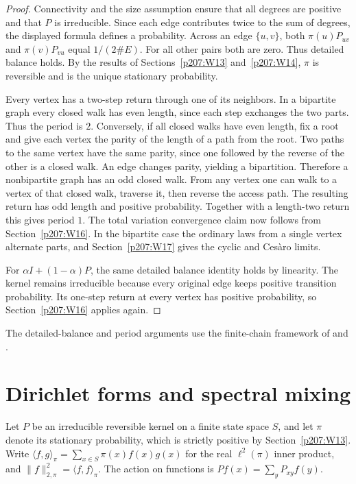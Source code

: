 \documentclass[11pt,oneside,openany]{book}
\theoremstyle{plain}
\theoremstyle{definition}
\theoremstyle{remark}
\begin{document}
\begin{proof}
Connectivity and the size assumption ensure that all degrees are
positive and that \(P\) is irreducible. Since each edge contributes
twice to the sum of degrees, the displayed formula defines a
probability. Across an edge \(\{u,v\}\), both \(\pi(u)P_{uv}\)
and \(\pi(v)P_{vu}\) equal \(1/(2\#E)\). For all other pairs both
are zero. Thus detailed balance holds. By the results of
Sections~\ref{p207:W13} and~\ref{p207:W14}, \(\pi\) is reversible
and is the unique stationary probability.

Every vertex has a two-step return through one of its neighbors.
In a bipartite graph every closed walk has even length, since each
step exchanges the two parts. Thus the period is \(2\).
Conversely, if all closed walks have even length, fix a root and
give each vertex the parity of the length of a path from the root.
Two paths to the same vertex have the same parity, since one
followed by the reverse of the other is a closed walk. An edge
changes parity, yielding a bipartition. Therefore a nonbipartite
graph has an odd closed walk. From any vertex one can walk to a
vertex of that closed walk, traverse it, then reverse the access
path. The resulting return has odd length and positive
probability. Together with a length-two return this gives period
\(1\). The total variation convergence claim now follows from
Section~\ref{p207:W16}. In the bipartite case the ordinary laws from
a single vertex alternate parts, and
Section~\ref{p207:W17} gives the cyclic and Ces\`aro limits.

For \(\alpha I+(1-\alpha)P\), the same detailed balance identity
holds by linearity. The kernel remains irreducible because every
original edge keeps positive transition probability. Its
one-step return at every vertex has positive probability, so
Section~\ref{p207:W16} applies again.
\end{proof}

The detailed-balance and period arguments use the finite-chain
framework of \cite[\S\S1.8--1.9]{Norris} and
\cite[\S\S5.5--5.6]{Durrett}.

\section{Dirichlet forms and spectral mixing}
\label{p207:W25}

Let \(P\) be an irreducible reversible kernel on a finite state space
\(S\), and let \(\pi\) denote its stationary probability, which is
strictly positive by Section~\ref{p207:W13}. Write
\(\langle f,g\rangle_\pi=\sum_{x\in S}\pi(x)f(x)g(x)\) for the real
\(\ell^2(\pi)\) inner product, and
\(\lVert f\rVert_{2,\pi}^2=\langle f,f\rangle_\pi\).
The action on functions is \(P f(x)=\sum_y P_{xy}f(y)\).
\end{document}
